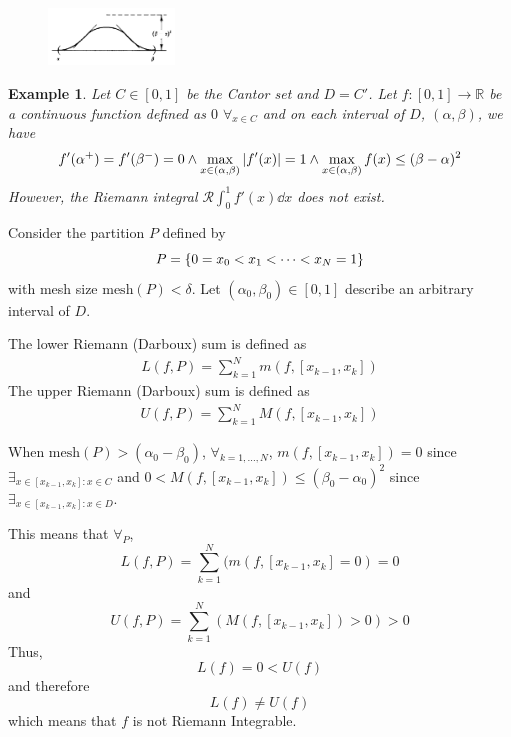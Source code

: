 \documentclass[]{article}
\newcommand{\R}{\mathbb{R}}
\newtheorem{example}{Example}
\begin{document}
\begin{figure}[h]
    \centering
    \includegraphics*[width=0.3\textwidth]{figs/pblm5.png}
\end{figure}


\begin{example}
    Let $C \in [0,1]$ be the Cantor set and $D = C'$.
    Let $f : [0,1] \to \R$ be a continuous function defined as $0$ $\forall_{x\in C}$ and on each interval of $D$, $(\alpha,\beta)$, we have \[
        f'(\alpha^+) = f'(\beta^-) = 0 \land \max_{x\in(\alpha,\beta)} \abs{f'(x)}=1 \land \max_{x\in(\alpha,\beta)} f(x) \leq (\beta - \alpha)^2
    \] However, the Riemann integral $\mathcal{R} \int_{0}^{1} f'(x) \dd{x}$ does not exist.
\end{example}

Consider the partition $P$ defined by\[
    P = \qty{0 = x_0 < x_1 < \cdots < x_N = 1}
\] with mesh size $\text{mesh}(P) < \delta$. 
Let $(\alpha_0, \beta_0) \in [0,1]$ describe an arbitrary interval of $D$.

The lower Riemann (Darboux) sum is defined as \begin{align*}
    L(f,P) = \sum_{k=1}^{N} m(f, [x_{k-1}, x_k])
\end{align*} The upper Riemann (Darboux) sum is defined as \begin{align*}
    U(f,P) = \sum_{k=1}^{N} M(f, [x_{k-1}, x_k])
\end{align*}

When $\text{mesh}(P) > (\alpha_0 - \beta_0)$, $\forall_{k=1,\dots,N}$, $m(f, [x_{k-1}, x_{k}]) = 0$ since $\exists_{x \in [x_{k-1}, x_{k}] : x \in C}$ and $0 < M(f, [x_{k-1}, x_{k}]) \leq (\beta_0 - \alpha_0)^2$ since $\exists_{x \in [x_{k-1}, x_{k}] : x \in D}$.

This means that $\forall_{P}$, \[
    L(f,P) = \sum_{k=1}^{N} (m(f, [x_{k-1}, x_{k}] = 0) = 0
\] and \[
    U(f,P) = \sum_{k=1}^{N} (M(f, [x_{k-1}, x_{k}]) > 0) > 0
\] Thus, \[
    L(f) = 0 < U(f)
\] and therefore \[
    L(f) \neq U(f) 
\] which means that $f$ is not Riemann Integrable.
\end{document}
